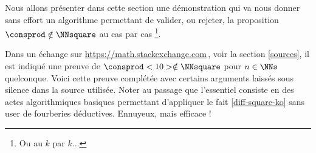 Nous allons présenter dans cette section une démonstration qui va nous donner sans effort un algorithme permettant de valider, ou rejeter, la proposition $\consprod \notin \NNsquare$ au cas par cas
\footnote{
	Ou au $k$ par $k$...
}. 

\medskip

Dans un échange sur \url{https://math.stackexchange.com}\,, voir la section \ref{sources}, il est indiqué une preuve de $\consprod<10> \notin \NNsquare$ pour $n \in \NNs$ quelconque.
Voici cette preuve complétée avec certains arguments laissés sous silence dans la source utilisée.
Noter au passage que l'essentiel consiste en des actes algorithmiques basiques permettant d'appliquer le fait \ref{diff-square-ko} sans user de fourberies déductives. Ennuyeux, mais efficace !




